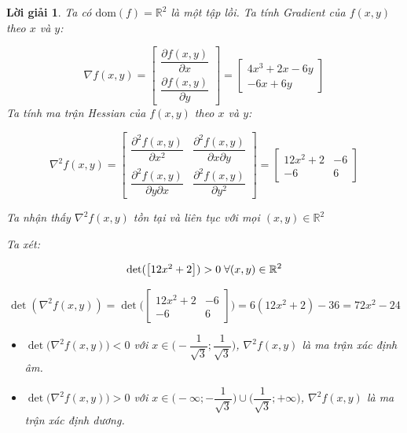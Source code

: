 \documentclass[14pt, a4paper]{article}
\theoremstyle{sltheorem}
\theoremstyle{soltheorem}
\newtheorem*{loigiai}{Lời giải}
\begin{document}
    \begin{loigiai}
        Ta có $\mathrm{dom}(f)=\mathbb{R}^2$ là một tập lồi. Ta tính Gradient của $f(x, y)$ theo $x$ và $y$:

        \begin{equation*}
            \nabla f(x, y) = \begin{bmatrix} \dfrac{\partial f(x, y)}{\partial x} \\ \dfrac{\partial f(x, y)}{\partial y}\end{bmatrix} = \begin{bmatrix} 4x^3 + 2x - 6y \\ -6x + 6y \end{bmatrix}
        \end{equation*}
        Ta tính ma trận Hessian của $f(x, y)$ theo $x$ và $y$:

        \begin{equation*}
            \nabla^2 f(x,y)=\begin{bmatrix} \dfrac{\partial^2 f(x, y)}{\partial x^2} & \dfrac{\partial^2 f(x, y)}{\partial x\partial y} \\ \dfrac{\partial^2 f(x, y)}{\partial y \partial x } & \dfrac{\partial^2 f(x, y)}{\partial y^2 } \end{bmatrix}=\begin{bmatrix} 12x^2 + 2 & -6 \\ -6 & 6 \end{bmatrix}
        \end{equation*}

        Ta nhận thấy $\nabla^2 f(x, y)$ tồn tại và liên tục với mọi $(x, y) \in \mathbb{R}^{2}$

        Ta xét:

        \begin{equation*}
            \det(\begin{bmatrix} 12x^2 + 2  \end{bmatrix})>0 \thickspace \forall (x, y) \in \mathbb{R}^2
        \end{equation*}

        \begin{equation*}
            \det(\nabla^2 f(x,y))=\det\Bigg(\begin{bmatrix} 12x^2 + 2 & -6 \\ -6 & 6 \end{bmatrix} \Bigg)=6(12x^2 + 2) - 36 =72x^2 - 24
        \end{equation*}

        \begin{itemize}
            \item $\det\Big(\nabla^2 f(x,y)\Big) < 0$ với $x \in \Big(-\dfrac{1}{\sqrt{3}}; \dfrac{1}{\sqrt{3}}\Big)$, $\nabla^2 f(x,y)$ là ma trận xác định âm.
            \item $\det\Big(\nabla^2 f(x,y)\Big) > 0$ với $x \in \Big(-\infty;-\dfrac{1}{\sqrt{3}}\Big) \cup \Big(\dfrac{1}{\sqrt{3}}; +\infty\Big)$, $\nabla^2 f(x,y)$ là ma trận xác định dương.
        \end{itemize}


\end{loigiai}
\end{document}
